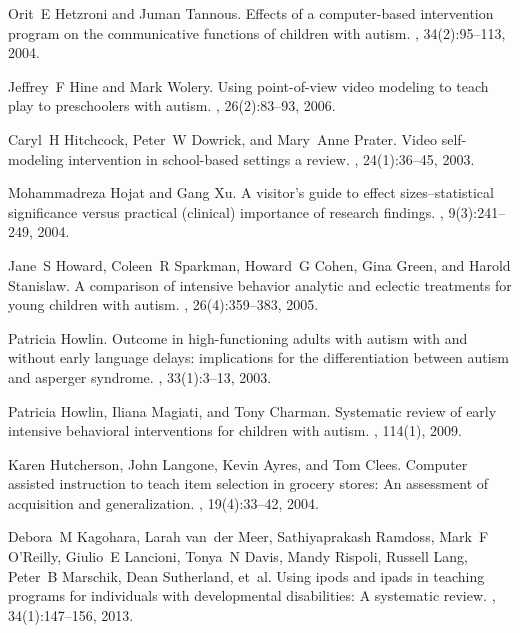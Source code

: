 \documentclass{ut-thesis}
\begin{document}
\begin{thebibliography}{100}
Orit~E Hetzroni and Juman Tannous.
\newblock Effects of a computer-based intervention program on the communicative
  functions of children with autism.
, 34(2):95--113,
  2004.

Jeffrey~F Hine and Mark Wolery.
\newblock Using point-of-view video modeling to teach play to preschoolers with
  autism.
, 26(2):83--93,
  2006.

Caryl~H Hitchcock, Peter~W Dowrick, and Mary~Anne Prater.
\newblock Video self-modeling intervention in school-based settings a review.
, 24(1):36--45, 2003.

Mohammadreza Hojat and Gang Xu.
\newblock A visitor's guide to effect sizes--statistical significance versus
  practical (clinical) importance of research findings.
, 9(3):241--249, 2004.

Jane~S Howard, Coleen~R Sparkman, Howard~G Cohen, Gina Green, and Harold
  Stanislaw.
\newblock A comparison of intensive behavior analytic and eclectic treatments
  for young children with autism.
, 26(4):359--383, 2005.

Patricia Howlin.
\newblock Outcome in high-functioning adults with autism with and without early
  language delays: implications for the differentiation between autism and
  asperger syndrome.
, 33(1):3--13,
  2003.

Patricia Howlin, Iliana Magiati, and Tony Charman.
\newblock Systematic review of early intensive behavioral interventions for
  children with autism.
, 114(1), 2009.

Karen Hutcherson, John Langone, Kevin Ayres, and Tom Clees.
\newblock Computer assisted instruction to teach item selection in grocery
  stores: An assessment of acquisition and generalization.
, 19(4):33--42, 2004.

Debora~M Kagohara, Larah van~der Meer, Sathiyaprakash Ramdoss, Mark~F
  O’Reilly, Giulio~E Lancioni, Tonya~N Davis, Mandy Rispoli, Russell Lang,
  Peter~B Marschik, Dean Sutherland, et~al.
\newblock Using ipods{\textregistered} and ipads{\textregistered} in teaching
  programs for individuals with developmental disabilities: A systematic
  review.
, 34(1):147--156, 2013.


\end{thebibliography}
\end{document}
